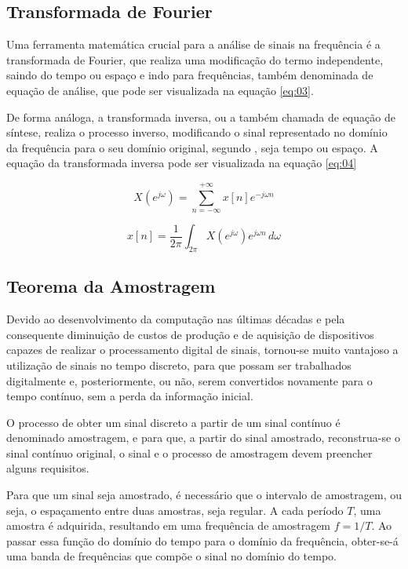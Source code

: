 \subsection{Transformada de Fourier}
Uma ferramenta matemática crucial para a análise de sinais na frequência é a transformada de Fourier, que realiza uma modificação do termo independente, saindo do tempo ou espaço e indo para frequências, também denominada de equação de análise, que pode ser visualizada na equação \ref{eq:03}. \par De forma análoga, a transformada inversa, ou a também chamada de equação de síntese, realiza o processo inverso, modificando o sinal representado no domínio da frequência para o seu domínio original, segundo \cite{oppenheim2010sinais}, seja tempo ou espaço. A equação da transformada inversa pode ser visualizada na equação \ref{eq:04}

\begin{equation}  \label{eq:03}
X(e^{j\omega})= \sum_{n=-\infty}^{+\infty} x[n]e^{-j\omega n}
\end{equation}

\begin{equation}  \label{eq:04}
x[n]=\frac{1}{2\pi} \int_{2\pi}^{} X(e^{j\omega})e^{j\omega n} \,d\omega
\end{equation}

\subsection{Teorema da Amostragem}
Devido ao desenvolvimento da computação nas últimas décadas e pela consequente diminuição de custos de produção e de aquisição de dispositivos capazes de realizar o processamento digital de sinais, tornou-se muito vantajoso a utilização de sinais no tempo discreto, para que possam ser trabalhados digitalmente e, posteriormente, ou não, serem convertidos novamente para o tempo contínuo, sem a perda da informação inicial. 

O processo de obter um sinal discreto a partir de um sinal contínuo é denominado amostragem, e para que, a partir do sinal amostrado, reconstrua-se o sinal contínuo original, o sinal e o processo de amostragem devem preencher alguns requisitos.

Para que um sinal seja amostrado, é necessário que o intervalo de amostragem, ou seja, o espaçamento entre duas amostras, seja regular. A cada período $T$, uma amostra é adquirida, resultando em uma frequência de amostragem $f = 1/T$. Ao passar essa função do domínio do tempo para o domínio da frequência, obter-se-á uma banda de frequências que compõe o sinal no domínio do tempo.

